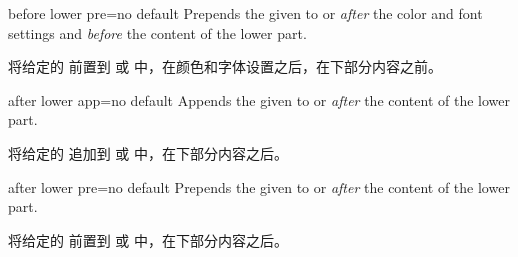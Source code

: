 \begin{docTcbKey}{before lower pre}{=}{no default}
Prepends the given  to  or  \emph{after} the color and font settings
and \emph{before} the content of the lower part.

将给定的  前置到  或  中，在颜色和字体设置之后，在下部分内容之前。
\end{docTcbKey}

\begin{docTcbKey}{after lower app}{=}{no default}
Appends the given  to  or  \emph{after} the content of the lower part.

将给定的  追加到  或  中，在下部分内容之后。
\end{docTcbKey}

\begin{docTcbKey}{after lower pre}{=}{no default}
Prepends the given  to  or  \emph{after} the content of the lower part.

将给定的  前置到  或  中，在下部分内容之后。
\end{docTcbKey}
